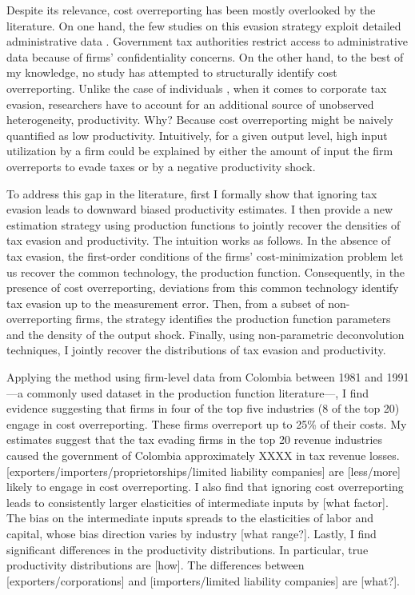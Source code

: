 \documentclass[
  12pt]{article}
\begin{document}
Despite its relevance, cost overreporting has been mostly overlooked by
the literature. On one hand, the few studies on this evasion strategy
exploit detailed administrative data \citep{Zumaya2021, Carrillo2022}.
Government tax authorities restrict access to administrative data
because of firms' confidentiality concerns. On the other hand, to the
best of my knowledge, no study has attempted to structurally identify
cost overreporting. Unlike the case of individuals
\citep{Pissarides1989, Paulus2015}, when it comes to corporate tax
evasion, researchers have to account for an additional source of
unobserved heterogeneity, productivity. Why? Because cost overreporting
might be naively quantified as low productivity. Intuitively, for a
given output level, high input utilization by a firm could be explained
by either the amount of input the firm overreports to evade taxes or by
a negative productivity shock.

To address this gap in the literature, first I formally show that
ignoring tax evasion leads to downward biased productivity estimates. I
then provide a new estimation strategy using production functions to
jointly recover the densities of tax evasion and productivity. The
intuition works as follows. In the absence of tax evasion, the
first-order conditions of the firms' cost-minimization problem let us
recover the common technology, the production function. Consequently, in
the presence of cost overreporting, deviations from this common
technology identify tax evasion up to the measurement error. Then, from
a subset of non-overreporting firms, the strategy identifies the
production function parameters and the density of the output shock.
Finally, using non-parametric deconvolution techniques, I jointly
recover the distributions of tax evasion and productivity.

Applying the method using firm-level data from Colombia between 1981 and
1991 ---a commonly used dataset in the production function
literature---, I find evidence suggesting that firms in four of the top
five industries (8 of the top 20) engage in cost overreporting. These
firms overreport up to 25\% of their costs. My estimates suggest that
the tax evading firms in the top 20 revenue industries caused the
government of Colombia approximately XXXX in tax revenue losses.
{[}exporters/importers/proprietorships/limited liability companies{]}
are {[}less/more{]} likely to engage in cost overreporting. I also find
that ignoring cost overreporting leads to consistently larger
elasticities of intermediate inputs by {[}what factor{]}. The bias on
the intermediate inputs spreads to the elasticities of labor and
capital, whose bias direction varies by industry {[}what range?{]}.
Lastly, I find significant differences in the productivity
distributions. In particular, true productivity distributions are
{[}how{]}. The differences between {[}exporters/corporations{]} and
{[}importers/limited liability companies{]} are {[}what?{]}.
\end{document}

